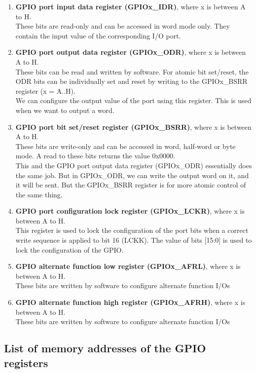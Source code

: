 \documentclass[footheight=20pt, footsepline, headheight=20pt, headsepline]{scrartcl}
\begin{document}
\begin{enumerate}
    \item \textbf{GPIO port input data register (GPIOx\_IDR)}, where x is between A to H.
    \\ These bits are read-only and can be accessed in word mode only. They contain the input value of the corresponding I/O port.
    \item \textbf{GPIO port output data register (GPIOx\_ODR)}, where x is between A to H.
    \\ These bits can be read and written by software. For atomic bit set/reset, the ODR bits can be individually set and reset by writing to the GPIOx\_BSRR register (x = A..H).
   \\ We can configure the output value of the port using this register. This is used when we want to output a word.
   \item \textbf{GPIO port bit set/reset register (GPIOx\_BSRR)}, where x is between A to H.
   \\These bits are write-only and can be accessed in word, half-word or byte mode. A read to these bits returns the value 0x0000. 
   \\This and the GPIO port output data register (GPIOx\_ODR) essentially does the same job. But in GPIOx\_ODR, we can write the output word on it, and it will be sent. But the GPIOx\_BSRR register is for more atomic control of the same thing.
   
   \item \textbf{GPIO port configuration lock register (GPIOx\_LCKR)}, where x is between A to H.
    \\ This register is used to lock the configuration of the port bits when a correct write sequence is applied to bit 16 (LCKK). The value of bits [15:0] is used to lock the configuration of the GPIO.
    \item \textbf{GPIO alternate function low register (GPIOx\_AFRL)}, where x is between A to H.
    \\ These bits are written by software to configure alternate function I/Os
    \item \textbf{GPIO alternate function high register (GPIOx\_AFRH)}, where x is between A to H.
    \\ These bits are written by software to configure alternate function I/Os

\end{enumerate}
\subsection*{List of memory addresses of the GPIO registers}
\vspace{.5cm}
\end{document}

